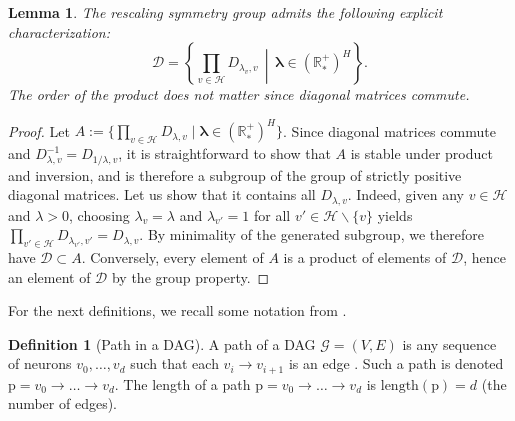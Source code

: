 \documentclass{article}
\theoremstyle{plain}
\newtheorem{lemma}[theorem]{Lemma}
\theoremstyle{definition}
\newtheorem{definition}[theorem]{Definition}
\theoremstyle{remark}
\def\Dcal{\mathcal{D}}
\def\R{{\mathbb{R}}}
\def\path{{\mathrm{p}}}
\def\Dcal{{\mathcal{D}}}
\begin{document}
{\begin{lemma}
\label{lemma:resc_mat}
The rescaling symmetry group admits the following explicit characterization:
\begin{equation}
    \Dcal = \left\{ \prod_{v \in \mathcal{H}} D_{\lambda_v,v} \,\middle|\, \boldsymbol{\lambda} \in (\R_*^{+})^{H} \right\}.
\end{equation}
The order of the product does not matter since diagonal matrices commute.
\end{lemma}

\begin{proof}
    Let $A :=  \{ \prod_{v \in \mathcal{H}}  D_{\lambda,v} \mid \boldsymbol{\lambda} \in (\R_*^{+})^{ H } \}$.
    Since diagonal matrices commute and $D_{\lambda,v}^{-1}=D_{1/\lambda,v}$, it is straightforward to show that $A$ is stable under product and inversion, and is therefore a subgroup of the group of strictly positive diagonal matrices.
    Let us show that it contains all $D_{\lambda, v}$. Indeed, 
    given any $v \in \mathcal{H}$ and $\lambda > 0$, choosing $\lambda_v=\lambda$ and $\lambda_{v'} = 1$ for all $v' \in \mathcal{H} \backslash\{v\}$ yields $\prod_{v' \in \mathcal{H} } D_{\lambda_{v'},v'} = D_{\lambda,v}$.
    By minimality of the generated subgroup, we therefore have $\Dcal \subset A$.
    Conversely, every element of $A$ is a product of elements of $\Dcal$, hence an element of $\Dcal$ by the group property.
\end{proof}

For the next definitions, we recall some notation from \citet{gonon2023path}.

\begin{definition}[Path in a DAG] \citep[Definition A.1]{gonon2023path}
\label{def:path}
A path of a DAG $\mathcal{G} = (V, E)$ is any sequence of neurons $v_0, \ldots, v_d$ such that each $v_i \rightarrow v_{i+1}$ is an edge . Such a path is denoted $\path = v_0 \rightarrow \ldots \rightarrow v_d$. The length of a path $\path = v_0 \rightarrow \ldots \rightarrow v_d$ is $\text{length}(\path) = d$ (the number of edges).
\end{definition}





}
\end{document}
